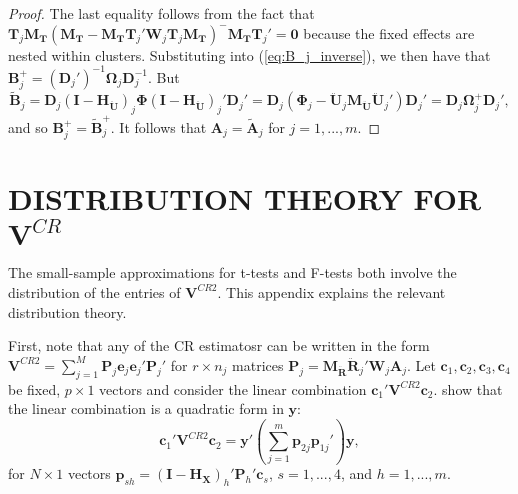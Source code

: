 \documentclass[12pt]{article}\usepackage[]{graphicx}\usepackage[]{color}
\newcommand{\bm}{\mathbf}
\newcommand{\bs}{\boldsymbol}
\begin{document}
\begin{proof}
The last equality follows from the fact that $\bm{T}_j \bm{M_T}\left(\bm{M_T} - \bm{M_T}\bm{T}_j' \bm{W}_j \bm{T}_j\bm{M_T}\right)^{-} \bm{M_T} \bm{T}_j' = \bm{0}$ because the fixed effects are nested within clusters. 
Substituting into (\ref{eq:B_j_inverse}), we then have that $\bm{B}_j^+ = \left(\bm{D}_j'\right)^{-1} \bs\Omega_j \bm{D}_j^{-1}$. 
But \[
\bm{\tilde{B}}_j = \bm{D}_j \left(\bm{I} - \bm{H_{\ddot{U}}}\right)_j \bs\Phi \left(\bm{I} - \bm{H_{\ddot{U}}}\right)_j' \bm{D}_j' = \bm{D}_j \left(\bs\Phi_j - \bm{\ddot{U}}_j\bm{M_{\ddot{U}}} \bm{\ddot{U}}_j'\right) \bm{D}_j' = \bm{D}_j \bs\Omega_j^+ \bm{D}_j',
\]
and so $\bm{B}_j^+ = \bm{\tilde{B}}_j^+$. It follows that $\bm{A}_j = \bm{\tilde{A}}_j$ for $j = 1,...,m$. 
\end{proof}

\section{DISTRIBUTION THEORY FOR $\bm{V}^{CR}$}
\label{app:VCR_dist}

The small-sample approximations for t-tests and F-tests both involve the distribution of the entries of $\bm{V}^{CR2}$. This appendix explains the relevant distribution theory.

First, note that any of the CR estimatosr can be written in the form $\bm{V}^{CR2} = \sum_{j=1}^M \bm{P}_j \bm{e}_j \bm{e}_j' \bm{P}_j'$ for $r \times n_j$ matrices $\bm{P}_j = \bm{M_{\ddot{R}}} \bm{\ddot{R}}_j' \bm{W}_j \bm{A}_j$.
Let $\bm{c}_1,\bm{c}_2,\bm{c}_3,\bm{c}_4$ be fixed, $p \times 1$ vectors and consider the linear combination $\bm{c}_1' \bm{V}^{CR2} \bm{c}_2$. 
\citet[Theorem 4]{Bell2002bias} show that the linear combination is a quadratic form in $\bm{y}$: \[
\bm{c}_1' \bm{V}^{CR2} \bm{c}_2 = \bm{y}'\left(\sum_{j=1}^m \bm{p}_{2j} \bm{p}_{1j}'\right) \bm{y}, \]
for $N \times 1$ vectors $\bm{p}_{sh} = \left(\bm{I} - \bm{H_X}\right)_h' \bm{P}_h' \bm{c}_s$, $s = 1,...,4$, and $h = 1,...,m$. 
\end{document}
